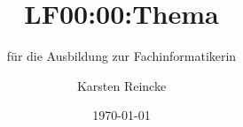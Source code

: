 \documentclass[]{beamer}
\title{LF00:00:Thema}
\subtitle{für die Ausbildung zur Fachinformatikerin}
\institute{GS-LDK}
\author{Karsten Reincke}
\date{\today}
\def\cfgGl{../../../cfg.gl/}
\begin{document}

\begin{frame}
  \titlepage
\end{frame}








\logo{}
\newpage




\end{document}
